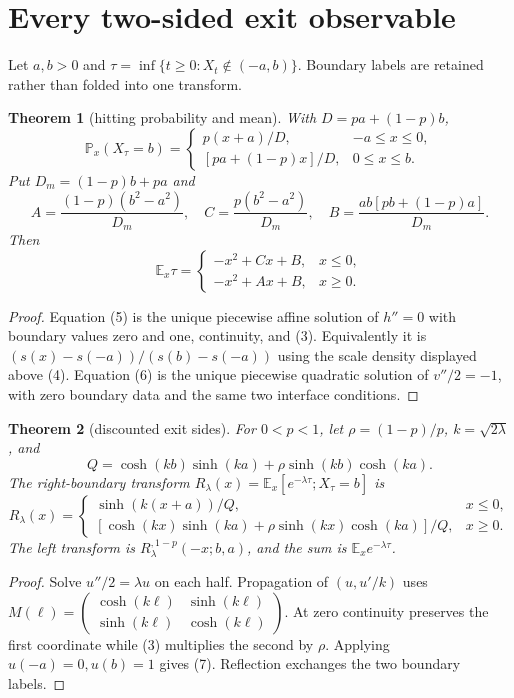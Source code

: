 \documentclass[10pt]{article}
\newtheorem{theorem}{Theorem}
\newcommand{\Prb}{\mathbb P}
\newcommand{\E}{\mathbb E}
\begin{document}
\section{Every two-sided exit observable}
Let $a,b>0$ and
$\tau=\inf\{t\ge0:X_t\notin(-a,b)\}$.  Boundary labels are retained rather
than folded into one transform.
\begin{theorem}[hitting probability and mean]
With $D=pa+(1-p)b$,
\begin{equation}
\Prb_x(X_\tau=b)=
\begin{cases}
p(x+a)/D,&-a\le x\le0,\\
[pa+(1-p)x]/D,&0\le x\le b.
\end{cases}
\end{equation}
Put $D_m=(1-p)b+pa$ and
\[
A=\frac{(1-p)(b^2-a^2)}{D_m},\quad
C=\frac{p(b^2-a^2)}{D_m},\quad
B=\frac{ab[pb+(1-p)a]}{D_m}.
\]
Then
\begin{equation}
\E_x\tau=
\begin{cases}-x^2+Cx+B,&x\le0,\\-x^2+Ax+B,&x\ge0.
\end{cases}
\end{equation}
\end{theorem}
\begin{proof}
Equation (5) is the unique piecewise affine solution of $h''=0$ with boundary
values zero and one, continuity, and (3).  Equivalently it is
$(s(x)-s(-a))/(s(b)-s(-a))$ using the scale density displayed above (4).
Equation (6) is the unique piecewise
quadratic solution of $v''/2=-1$, with zero boundary data and the same two
interface conditions.
\end{proof}

\begin{theorem}[discounted exit sides]
For $0<p<1$, let $\rho=(1-p)/p$, $k=\sqrt{2\lambda}$, and
\[
Q=\cosh(kb)\sinh(ka)+\rho\sinh(kb)\cosh(ka).
\]
The right-boundary transform $R_\lambda(x)=
\E_x[e^{-\lambda\tau};X_\tau=b]$ is
\begin{equation}
R_\lambda(x)=
\begin{cases}
\sinh(k(x+a))/Q,&x\le0,\\
[\cosh(kx)\sinh(ka)+\rho\sinh(kx)\cosh(ka)]/Q,&x\ge0.
\end{cases}
\end{equation}
The left transform is $R_\lambda^{,1-p}(-x;b,a)$, and the sum is
$\E_xe^{-\lambda\tau}$.
\end{theorem}
\begin{proof}
Solve $u''/2=\lambda u$ on each half.  Propagation of $(u,u'/k)$ uses
$M(\ell)=\left(\begin{smallmatrix}\cosh(k\ell)&\sinh(k\ell)\\
\sinh(k\ell)&\cosh(k\ell)\end{smallmatrix}\right)$.
At zero continuity preserves the first coordinate while (3) multiplies the
second by $\rho$.  Applying $u(-a)=0,u(b)=1$ gives (7).  Reflection exchanges
the two boundary labels.
\end{proof}
\end{document}
